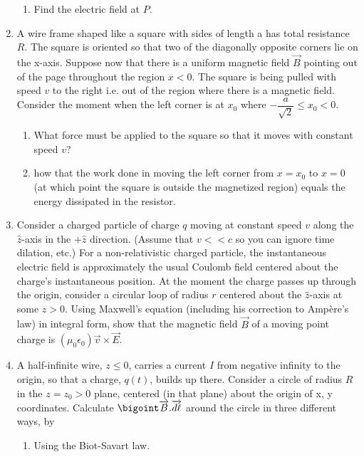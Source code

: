 \documentclass[fleqn]{article}
\begin{document}
\begin{enumerate}
\begin{enumerate}
      \item Find the electric field at $P$.
    \end{enumerate}


    \item A wire frame shaped like a square with sides of length a has total resistance $R$. The square is oriented 
    so that two of the diagonally opposite corners lie on the x-axis. Suppose now that there is a uniform
    magnetic field $\overrightarrow{B}$ pointing out of the page throughout the region $x < 0$. The square is being 
    pulled with speed $v$ to the right i.e. out of the region where there is a magnetic field. Consider the moment 
    when the left corner is at $x_0$ where $-\dfrac{a}{\sqrt{2}} \leq x_0 <0$.
    \begin{enumerate}
      \item What force must be applied to the square so that it moves with
      constant speed $v$?

      \item how that the work done in moving the left corner from $x=x_0$ to $x=0$ (at which 
      point the square is outside the magnetized region) equals the energy dissipated in the 
      resistor.
    \end{enumerate}

    \item Consider a charged particle of charge $q$ moving at constant speed $v$ along the $\hat{z}$-axis in the 
    $+ \hat{z}$ direction. (Assume that $v<<c$ so you can ignore time dilation, etc.) For a non-relativistic 
    charged particle, the instantaneous electric field is approximately the usual Coulomb field centered about 
    the charge’s instantaneous position. At the moment the charge passes up through the origin, consider a circular loop of
    radius $r$ centered about the $\hat{z}$-axis at some $z>0$. Using Maxwell’s equation (including his correction 
    to Ampère’s law) in integral form, show that the magnetic field $\overrightarrow{B}$ of a moving point charge is 
    $\left(\mu_0 \epsilon_0\right) \overrightarrow{v} \times \overrightarrow{E}$.


    \item A half-infinite wire, $z\leq 0$, carries a current $I$ from negative infinity to the origin, so that a 
    charge, $q(t)$, builds up there. Consider a circle of radius $R$ in the $z=z_0 > 0$ plane, centered (in that plane) about the
    origin of x, y coordinates. Calculate $\bigoint \overrightarrow{B}.\overrightarrow{d\ell}$ around the circle in three
    different ways, by
    \begin{enumerate}
      \item Using the Biot-Savart law.


\end{enumerate}
\end{enumerate}
\end{document}
